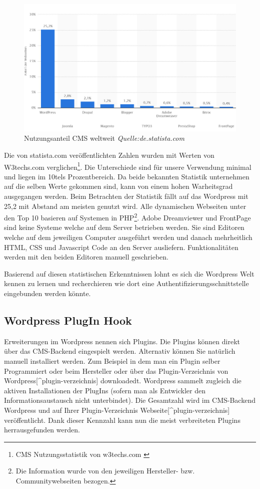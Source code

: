 \begin{figure}[htbp]
\centering
\includegraphics{images/cms_statistik_november2015.JPG}
\caption{Nutzungsanteil CMS weltweit \emph{Quelle:de.statista.com}}
\end{figure}

Die von statista.com veröffentlichten Zahlen wurden mit Werten von
W3techs.com verglichen\footnote{CMS Nutzungsstatistik von w3techs.com
  \autocite{statisticinfow3techs}}. Die Unterschiede sind für unsere
Verwendung minimal und liegen im 10tels Prozentbereich. Da beide
bekannten Statistik unternehmen auf die selben Werte gekommen sind, kann
von einem hohen Warheitsgrad ausgegangen werden. Beim Betrachten der
Statistik fällt auf das Wordpress mit 25,2 mit Abstand am meisten
genutzt wird. Alle dynamischen Webseiten unter den Top 10 basieren auf
Systemen in PHP\footnote{Die Information wurde von den jeweiligen
  Hersteller- bzw. Communitywebseiten bezogen.}. Adobe Dreamviewer und
FrontPage sind keine Systeme welche auf dem Server betrieben werden. Sie
sind Editoren welche auf dem jeweiligen Computer ausgeführt werden und
danach mehrheitlich HTML, CSS und Javascript Code an den Server
ausliefern. Funktionalitäten werden mit den beiden Editoren manuell
geschrieben.

Basierend auf diesen statistischen Erkenntnissen lohnt es sich die
Wordpress Welt kennen zu lernen und recherchieren wie dort eine
Authentifizierungsschnittstelle eingebunden werden könnte.

\hypertarget{wordpress-plugin-hook}{\subsection{Wordpress PlugIn
Hook}\label{wordpress-plugin-hook}}

Erweiterungen im Wordpress nennen sich Plugins. Die Plugins können
direkt über das CMS-Backend eingespielt werden. Alternativ können Sie
natürlich manuell installiert werden. Zum Beispiel in dem man ein Plugin
selber Programmiert oder beim Hersteller oder über das
Plugin-Verzeichnis von Wordpress{[}\^{}plugin-verzeichnis{]}
downloadedt. Wordpress sammelt zugleich die aktiven Installationen der
PlugIns (sofern man als Entwickler den Informationsaustausch nicht
unterbindet). Die Gesamtzahl wird im CMS-Backend Wordpress und auf Ihrer
Plugin-Verzeichnis Webseite{[}\^{}plugin-verzeichnis{]} veröffentlicht.
Dank dieser Kennzahl kann nun die meist verbreiteten Plugins
herrausgefunden werden.

